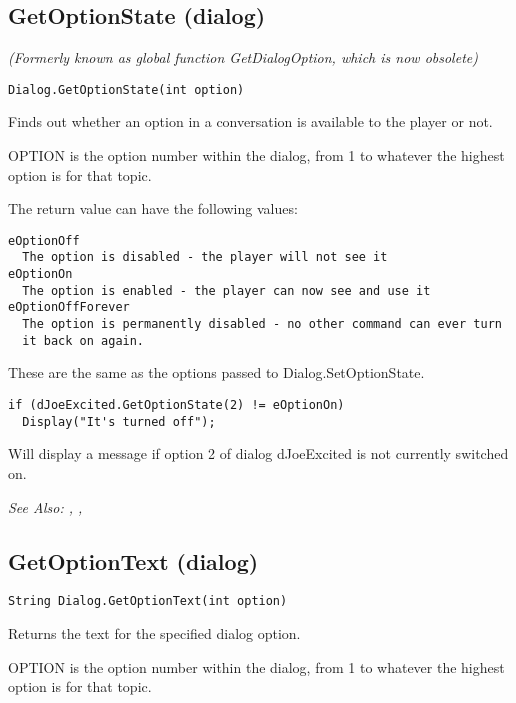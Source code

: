 \subsection{GetOptionState (dialog)}\label{Dialog.GetOptionState}%

\it{(Formerly known as global function GetDialogOption, which is now obsolete)}

\begin{verbatim}
Dialog.GetOptionState(int option)
\end{verbatim}
Finds out whether an option in a conversation is available to the player or
not.

OPTION is the option number within the dialog, from 1 to whatever the
highest option is for that topic.

The return value can have the following values:
\begin{verbatim}
eOptionOff
  The option is disabled - the player will not see it
eOptionOn
  The option is enabled - the player can now see and use it
eOptionOffForever
  The option is permanently disabled - no other command can ever turn
  it back on again.
\end{verbatim}
These are the same as the options passed to Dialog.SetOptionState.

\begin{verbatim}
if (dJoeExcited.GetOptionState(2) != eOptionOn)
  Display("It's turned off");
\end{verbatim}
Will display a message if option 2 of dialog dJoeExcited is not currently switched on.

\it{See Also:} ,
,


\subsection{GetOptionText (dialog)}\label{Dialog.GetOptionText}%

\begin{verbatim}
String Dialog.GetOptionText(int option)
\end{verbatim}
Returns the text for the specified dialog option.

OPTION is the option number within the dialog, from 1 to whatever the
highest option is for that topic.

